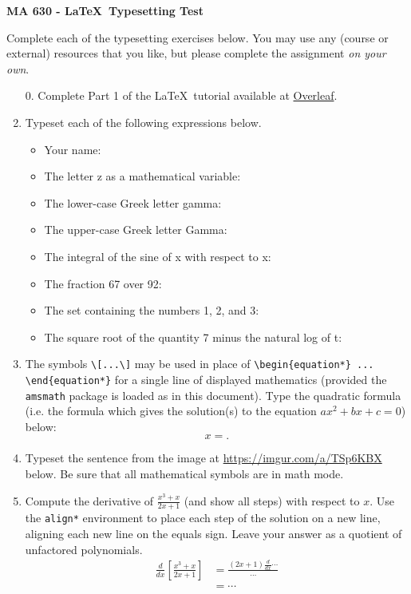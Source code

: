 \documentclass[12pt]{article}
\begin{document}
\pagestyle{empty}

 {\noindent \textbf{\large MA 630 - \LaTeX\ Typesetting Test}
\vspace{.25in}

Complete each of the typesetting exercises below. You may use any (course or external) resources that you like, but please complete the assignment \emph{on your own}.

\begin{enumerate}
\item[0.] Complete Part 1 of the \LaTeX\ tutorial available at \href{https://www.overleaf.com/learn/latex/Free_online_introduction_to_LaTeX_(part_1)}{Overleaf}.

\item Typeset each of the following expressions below.
	\begin{itemize}
	\item Your name: %
	\item The letter z as a mathematical variable: 
	\item The lower-case Greek letter gamma:
	\item The upper-case Greek letter Gamma:
	\item The integral of the sine of x with respect to x:
	\item The fraction 67 over 92:
	\item The set containing the numbers 1, 2, and 3:
	\item The square root of the quantity 7 minus the natural log of t:
	\end{itemize}

\item The symbols \verb|\[...\]| may be used in place of \verb|\begin{equation*} ... \end{equation*}| for a single line of displayed mathematics (provided the \verb|amsmath| package is loaded as in this document). Type the quadratic formula (i.e. the formula which gives the solution(s) to the equation $ax^2 + bx + c = 0$) below:
\[x = .\]

\item Typeset the sentence from the image at \href{https://imgur.com/a/TSp6KBX}{https://imgur.com/a/TSp6KBX} below. Be sure that all mathematical symbols are in math mode. \\


\item Compute the derivative of $\displaystyle \frac{x^3 + x}{2x + 1}$ (and show all steps) with respect to $x$. Use the \verb|align*| environment to place each step of the solution on a new line, aligning each new line on the equals sign. Leave your answer as a quotient of unfactored polynomials.
\begin{align*}
\frac{d}{dx} \left[\frac{x^3 + x}{2x+1}\right] &= \frac{(2x + 1)\frac{d}{dx} \cdots}{\cdots}\\
&=\cdots
\end{align*}


\end{enumerate}}
\end{document}
